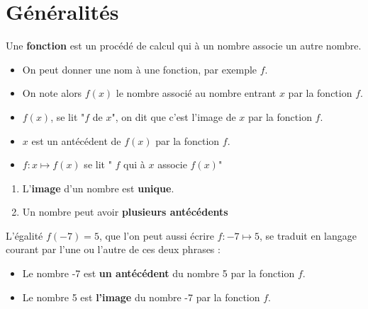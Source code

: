 \section{Généralités}
\begin{definition}
    Une \textbf{fonction} est un procédé de calcul qui à un nombre associe un autre nombre.

    \smallskip
    \begin{center}
    \end{center}
\end{definition}

\begin{vocabulaireNotations}        
        \begin{itemize}
            \item On peut donner une nom à une fonction, par exemple $f$.
            \item On note alors $f(x)$ le nombre associé au nombre entrant $x$ par la fonction $f$.
            \item $f(x)$, se lit "$f$ de $x$", on dit que c'est l'image de $x$ par la fonction $f$.
            \item $x$ est un antécédent de $f(x)$ par la fonction $f$.
            \item  $f : x\longmapsto f(x)$ se lit " $f$ qui à $x$ associe $f(x)$"
        \end{itemize}
\end{vocabulaireNotations}

\begin{remarques}
    \begin{enumerate}
        \item L'\textbf{image} d'un nombre est \textbf{unique}.
        \item Un nombre peut avoir \textbf{plusieurs antécédents}
    \end{enumerate}
\end{remarques}

\begin{exemple*1}
    L'égalité $f(-7)=5$, que l'on peut aussi écrire $f : -7\longmapsto 5$, se traduit en langage courant par l'une ou l'autre de ces deux phrases :
    \begin{itemize}
        \item Le nombre -7 est \textbf{un antécédent} du nombre 5 par la fonction $f$.
        \item Le nombre 5 est \textbf{l'image} du nombre -7 par la fonction $f$.
    \end{itemize}
\end{exemple*1}

